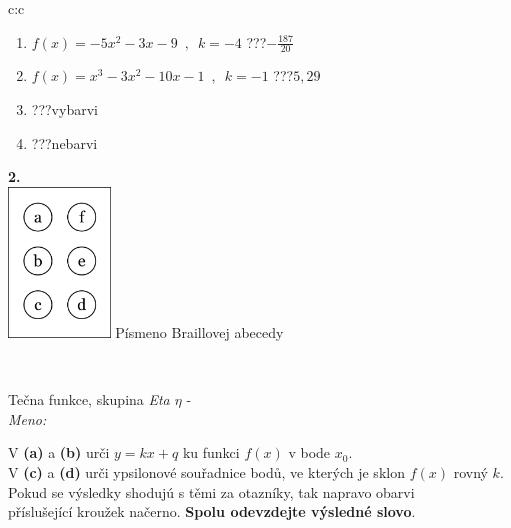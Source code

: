 \documentclass[10pt]{report}
\begin{document}
\begin{tabular}{c:c}
\begin{minipage}[c][104.5mm][t]{0.5\linewidth}
\begin{center}
\begin{minipage}{0.79\linewidth}
\begin{center}
\begin{varwidth}{\linewidth}
\begin{enumerate}
\item $f(x)=-5x^2-3x-9\enspace , \enspace k=-4$\quad \dotfill\; ???\;\dotfill \quad $-\frac{187}{20}$
\item $f(x)=x^3-3x^2-10x-1\enspace , \enspace k=-1$\quad \dotfill\; ???\;\dotfill \quad $5 , 29$
\item \quad \dotfill\; ???\;\dotfill \quad vybarvi
\item \quad \dotfill\; ???\;\dotfill \quad nebarvi
\end{enumerate}
\end{varwidth}
\end{center}
\end{minipage}
\begin{minipage}{0.20\linewidth}
\begin{center}
{\Huge\bfseries 2.} \\[2mm]
\includegraphics[height=40mm]{../images/braille.png}
{\small Písmeno Braillovej abecedy}
\end{center}
\end{minipage}
\end{center}
\end{minipage}
\\ \hdashline
\begin{minipage}[c][104.5mm][t]{0.5\linewidth}
\begin{center}
\vspace{7mm}
{\huge Tečna funkce, skupina \textit{Eta $\eta$} -}\\[5mm]
\textit{Meno:}\phantom{xxxxxxxxxxxxxxxxxxxxxxxxxxxxxxxxxxxxxxxxxxxxxxxxxxxxxxxxxxxxxxxxx}\\[5mm]
\begin{minipage}{0.95\linewidth}
\begin{center}
V \textbf{(a)} a \textbf{(b)} urči  $y = kx + q$ ku funkci $f(x)$ v bode $x_0$.\\V \textbf{(c)} a \textbf{(d)} urči ypsilonové souřadnice bodů, ve kterých je sklon $f(x)$ rovný $k$.\\Pokud se výsledky shodujú s těmi za otazníky, tak napravo obarvi\\příslušející kroužek načerno. \textbf{Spolu odevzdejte výsledné slovo}.

\end{center}
\end{minipage}
\end{center}
\end{minipage}
\end{tabular}
\end{document}
